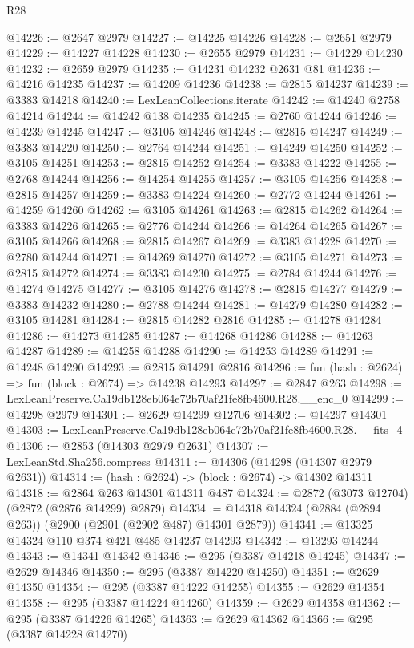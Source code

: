 \begin{lexlean}{R28}
\begin{coremodule}
@14226 := @2647 @2979
@14227 := @14225 @14226
@14228 := @2651 @2979
@14229 := @14227 @14228
@14230 := @2655 @2979
@14231 := @14229 @14230
@14232 := @2659 @2979
@14235 := @14231 @14232 @2631 @81
@14236 := @14216 @14235
@14237 := @14209 @14236
@14238 := @2815 @14237
@14239 := @3383 @14218
@14240 := LexLeanCollections.iterate
@14242 := @14240 @2758 @14214
@14244 := @14242 @138 @14235
@14245 := @2760 @14244
@14246 := @14239 @14245
@14247 := @3105 @14246
@14248 := @2815 @14247
@14249 := @3383 @14220
@14250 := @2764 @14244
@14251 := @14249 @14250
@14252 := @3105 @14251
@14253 := @2815 @14252
@14254 := @3383 @14222
@14255 := @2768 @14244
@14256 := @14254 @14255
@14257 := @3105 @14256
@14258 := @2815 @14257
@14259 := @3383 @14224
@14260 := @2772 @14244
@14261 := @14259 @14260
@14262 := @3105 @14261
@14263 := @2815 @14262
@14264 := @3383 @14226
@14265 := @2776 @14244
@14266 := @14264 @14265
@14267 := @3105 @14266
@14268 := @2815 @14267
@14269 := @3383 @14228
@14270 := @2780 @14244
@14271 := @14269 @14270
@14272 := @3105 @14271
@14273 := @2815 @14272
@14274 := @3383 @14230
@14275 := @2784 @14244
@14276 := @14274 @14275
@14277 := @3105 @14276
@14278 := @2815 @14277
@14279 := @3383 @14232
@14280 := @2788 @14244
@14281 := @14279 @14280
@14282 := @3105 @14281
@14284 := @2815 @14282 @2816
@14285 := @14278 @14284
@14286 := @14273 @14285
@14287 := @14268 @14286
@14288 := @14263 @14287
@14289 := @14258 @14288
@14290 := @14253 @14289
@14291 := @14248 @14290
@14293 := @2815 @14291 @2816
@14296 := fun (hash : @2624) => fun (block : @2674) => @14238 @14293
@14297 := @2847 @263
@14298 := LexLeanPreserve.Ca19db128eb064e72b70af21fe8fb4600.R28.__enc_0
@14299 := @14298 @2979
@14301 := @2629 @14299 @12706
@14302 := @14297 @14301
@14303 := LexLeanPreserve.Ca19db128eb064e72b70af21fe8fb4600.R28.__fits_4
@14306 := @2853 (@14303 @2979 @2631)
@14307 := LexLeanStd.Sha256.compress
@14311 := @14306 (@14298 (@14307 @2979 @2631))
@14314 := (hash : @2624) -> (block : @2674) -> @14302 @14311
@14318 := @2864 @263 @14301 @14311 @487
@14324 := @2872 (@3073 @12704) (@2872 (@2876 @14299) @2879)
@14334 := @14318 @14324 (@2884 (@2894 @263)) (@2900 (@2901 (@2902 @487) @14301 @2879))
@14341 := @13325 @14324 @110 @374 @421 @485 @14237 @14293
@14342 := @13293 @14244
@14343 := @14341 @14342
@14346 := @295 (@3387 @14218 @14245)
@14347 := @2629 @14346
@14350 := @295 (@3387 @14220 @14250)
@14351 := @2629 @14350
@14354 := @295 (@3387 @14222 @14255)
@14355 := @2629 @14354
@14358 := @295 (@3387 @14224 @14260)
@14359 := @2629 @14358
@14362 := @295 (@3387 @14226 @14265)
@14363 := @2629 @14362
@14366 := @295 (@3387 @14228 @14270)

\end{coremodule}
\end{lexlean}

